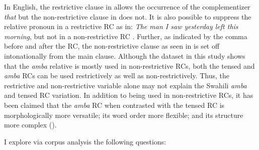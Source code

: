 \documentclass[output=paper,colorlinks,citecolor=brown]{langscibook}
\begin{document}
In English, the restrictive clause in  allows the occurrence of the complementizer \textit{that} but the non-restrictive clause in  does not. It is also possible to suppress the relative pronoun in a restrictive RC as in: \textit{The man I saw yesterday left this morning}, but not in a non-restrictive RC \citep[139]{Comrie1989}. Further, as indicated by the comma before and after the RC, the non-restrictive clause as seen in  is set off intonationally from the main clause. Although the dataset in this study shows that the \textit{amba} relative is mostly used in non-restrictive RCs, both the tensed and \textit{amba} RCs can be used restrictively as well as non-restrictively. Thus, the restrictive and non-restrictive variable alone may not explain the Swahili \textit{amba} and tensed RC variation. In addition to being used in non-restrictive RCs, it has been claimed that the \textit{amba} RC when contrasted with the tensed RC is morphologically more versatile; its word order more flexible; and its structure more complex (\citealt{Schadeberg1989, Russell1992}).

I explore via corpus analysis the following questions:
 
\end{document}
